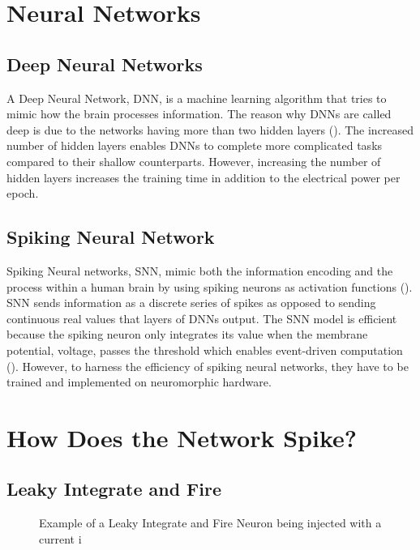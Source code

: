 \section{Neural Networks}

\subsection{Deep Neural Networks}

A Deep Neural Network, DNN, is a machine learning algorithm that tries to mimic how the brain processes information. The reason why DNNs are called deep is due to the networks having more than two hidden layers (). The increased number of hidden layers enables DNNs to complete more complicated tasks compared to their shallow counterparts. However, increasing the number of hidden layers increases the training time in addition to the electrical power per epoch. 

\subsection{Spiking Neural Network}

Spiking Neural networks, SNN, mimic both the information encoding and the process within a human brain by using spiking neurons as activation functions (). SNN sends information as a discrete series of spikes as opposed to sending continuous real values that layers of DNNs output. The SNN model is efficient because the spiking neuron only integrates its value when the membrane potential, voltage, passes the threshold which enables event-driven computation (). However, to harness the efficiency of spiking neural networks, they have to be trained and implemented on neuromorphic hardware.

\section{How Does the Network Spike?}

\subsection{Leaky Integrate and Fire}

\begin{figure}[h]
	\begin{center}
	
	\end{center}
	\caption{Example of a Leaky Integrate and Fire Neuron being injected with a current {i}}
\end{figure}

